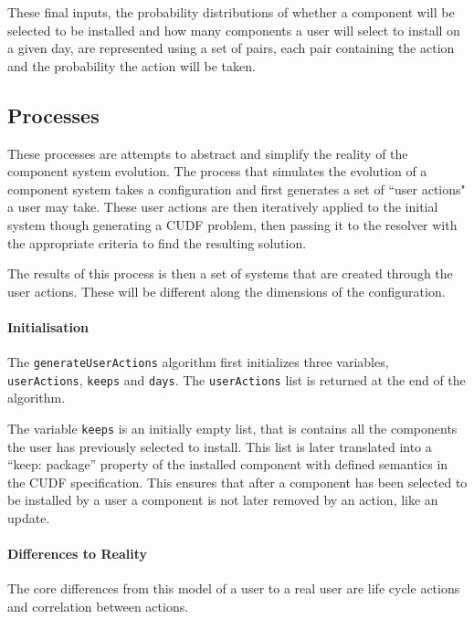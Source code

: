 These final inputs, the probability distributions of whether a component will be selected to be installed and how many components a user will select to install on a given day,
are represented using a set of pairs, each pair containing the action and the probability the action will be taken.



\subsection{Processes}
These processes are attempts to abstract and simplify the reality of the component system evolution.
The process that simulates the evolution of a component system takes a configuration and first generates a set of ``user actions" a user may take.
These user actions are then iteratively applied to the initial system though generating a CUDF problem,
then passing it to the resolver with the appropriate criteria to find the resulting solution.

The results of this process is then a set of systems that are created through the user actions.
These will be different along the dimensions of the configuration.



\paragraph{Initialisation}
The \verb+generateUserActions+ algorithm first initializes three variables, \verb+userActions+, \verb+keeps+ and \verb+days+.
The \verb+userActions+ list is returned at the end of the algorithm.

The variable \verb+keeps+ is an initially empty list, that is contains all the components the user has previously selected to install.
This list is later translated into a ``keep: package'' property of the installed component with defined semantics in the CUDF specification.
This ensures that after a component has been selected to be installed by a user a component is not later removed by an action, like an update.




\paragraph{Differences to Reality}
The core differences from this model of a user to a real user are life cycle actions and correlation between actions.

